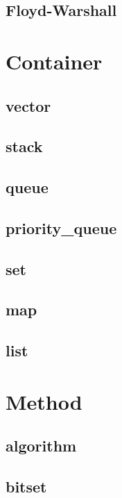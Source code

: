 \documentclass[a4paper, landscape, 8pt]{article}
\begin{document}
\begin{multicols*}{3}
\subsection{Floyd-Warshall}


\section{Container}
\subsection{vector}

\subsection{stack}

\subsection{queue}

\subsection{priority\_queue}

\subsection{set}

\subsection{map}

\subsection{list}


\section{Method}
\subsection{algorithm}

\subsection{bitset}


\end{multicols*}
\end{document}
